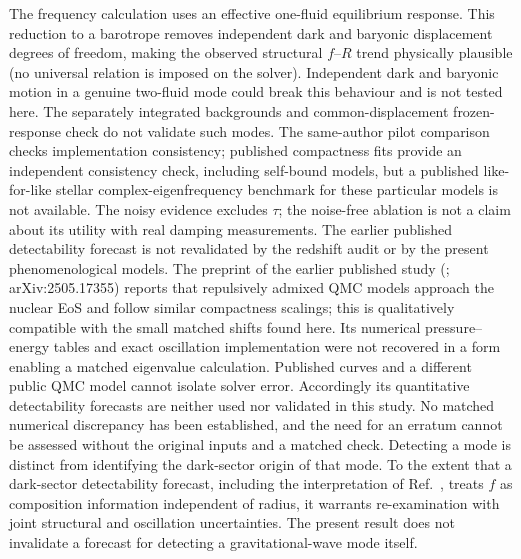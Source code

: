 \documentclass[11pt,a4paper]{article}
\begin{document}
The frequency calculation uses an effective one-fluid equilibrium response. This reduction to a barotrope removes independent dark and baryonic displacement degrees of freedom, making the observed structural $f$--$R$ trend physically plausible (no universal relation is imposed on the solver). Independent dark and baryonic motion in a genuine two-fluid mode could break this behaviour and is not tested here. The separately integrated backgrounds and common-displacement frozen-response check do not validate such modes. The same-author pilot comparison checks implementation consistency; published compactness fits provide an independent consistency check, including self-bound models, but a published like-for-like stellar complex-eigenfrequency benchmark for these particular models is not available. The noisy evidence excludes $\tau$; the noise-free ablation is not a claim about its utility with real damping measurements. The earlier published detectability forecast is not revalidated by the redshift audit or by the present phenomenological models. The preprint of the earlier published study (\citealt{HusainOsc}; arXiv:2505.17355) reports that repulsively admixed QMC models approach the nuclear EoS and follow similar compactness scalings; this is qualitatively compatible with the small matched shifts found here. Its numerical pressure--energy tables and exact oscillation implementation were not recovered in a form enabling a matched eigenvalue calculation. Published curves and a different public QMC model cannot isolate solver error. Accordingly its quantitative detectability forecasts are neither used nor validated in this study. No matched numerical discrepancy has been established, and the need for an erratum cannot be assessed without the original inputs and a matched check. Detecting a mode is distinct from identifying the dark-sector origin of that mode. To the extent that a dark-sector detectability forecast, including the interpretation of Ref.~\citet{HusainOsc}, treats $f$ as composition information independent of radius, it warrants re-examination with joint structural and oscillation uncertainties. The present result does not invalidate a forecast for detecting a gravitational-wave mode itself.
\end{document}
